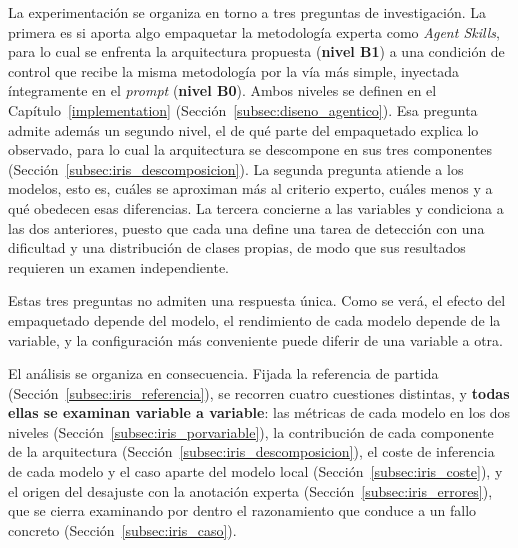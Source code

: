 %


La experimentación se organiza en torno a tres preguntas de investigación. La primera es si aporta
algo empaquetar la metodología experta como \textit{Agent Skills}, para lo cual se
enfrenta la arquitectura propuesta (\textbf{nivel B1}) a una condición de control
que recibe la misma metodología por la vía más simple, inyectada íntegramente en el
\textit{prompt} (\textbf{nivel B0}). Ambos niveles se definen en el
Capítulo~\ref{implementation} (Sección~\ref{subsec:diseno_agentico}). Esa pregunta
admite además un segundo nivel, el de qué parte del empaquetado explica lo observado,
para lo cual la arquitectura se descompone en sus tres componentes
(Sección~\ref{subsec:iris_descomposicion}). La segunda
pregunta atiende a los modelos, esto es, cuáles se aproximan más al criterio
experto, cuáles menos y a qué obedecen esas diferencias. La tercera concierne a las variables y condiciona a las dos
anteriores, puesto que cada una define una tarea de detección con una dificultad y
una distribución de clases propias, de modo que sus resultados requieren un examen
independiente.

Estas tres preguntas no admiten una respuesta única. Como se verá, el efecto del
empaquetado depende del modelo, el rendimiento de cada modelo depende de la
variable, y la configuración más conveniente puede diferir de una variable a otra.

El análisis se organiza en consecuencia. Fijada la referencia de partida
(Sección~\ref{subsec:iris_referencia}), se recorren cuatro cuestiones distintas, y
\textbf{todas ellas se examinan variable a variable}: las métricas de cada modelo en
los dos niveles (Sección~\ref{subsec:iris_porvariable}), la contribución de cada
componente de la arquitectura (Sección~\ref{subsec:iris_descomposicion}), el coste de
inferencia de cada modelo y el caso aparte del modelo local
(Sección~\ref{subsec:iris_coste}), y
el origen del desajuste con la anotación experta
(Sección~\ref{subsec:iris_errores}), que se cierra examinando por dentro el
razonamiento que conduce a un fallo concreto (Sección~\ref{subsec:iris_caso}).

